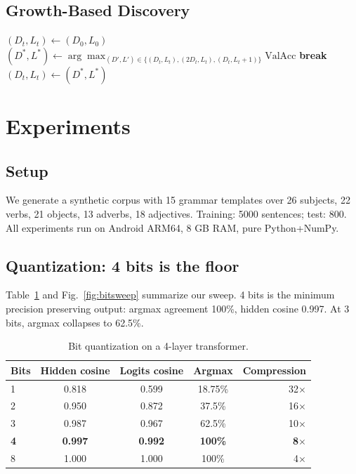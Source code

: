 \documentclass[11pt,a4paper]{article}
\begin{document}
\subsection{Growth-Based Discovery}
\begin{algorithm}[h]
\caption{Growth-based structure discovery}
\begin{algorithmic}[1]
\State $(D_t, L_t) \gets (D_0, L_0)$
  \State $(D^*, L^*) \gets \arg\max_{(D',L')\in\{(D_t,L_t),(2D_t,L_t),(D_t,L_t+1)\}} \mathrm{ValAcc}$
   \State \textbf{break} \EndIf
  \State $(D_t,L_t) \gets (D^*,L^*)$
\EndFor
\end{algorithmic}
\end{algorithm}

\section{Experiments}
\subsection{Setup}
We generate a synthetic corpus with 15 grammar templates over 26 subjects, 22 verbs, 21 objects, 13 adverbs, 18 adjectives. Training: 5000 sentences; test: 800. All experiments run on Android ARM64, 8 GB RAM, pure Python+NumPy.

\subsection{Quantization: 4 bits is the floor}
\label{sec:quant}
Table~\ref{tab:quant} and Fig.~\ref{fig:bitsweep} summarize our sweep. 4 bits is the minimum precision preserving output: argmax agreement 100\%, hidden cosine 0.997. At 3 bits, argmax collapses to 62.5\%.

\begin{table}[h]
\centering
\caption{Bit quantization on a 4-layer transformer.}
\label{tab:quant}
\begin{tabular}{lcccr}
\toprule
Bits & Hidden cosine & Logits cosine & Argmax & Compression \\
\midrule
1 & 0.818 & 0.599 & 18.75\% & 32$\times$ \\
2 & 0.950 & 0.872 & 37.5\% & 16$\times$ \\
3 & 0.987 & 0.967 & 62.5\% & 10$\times$ \\
\textbf{4} & \textbf{0.997} & \textbf{0.992} & \textbf{100\%} & \textbf{8$\times$} \\
8 & 1.000 & 1.000 & 100\% & 4$\times$ \\
\bottomrule
\end{tabular}
\end{table}
\end{document}

